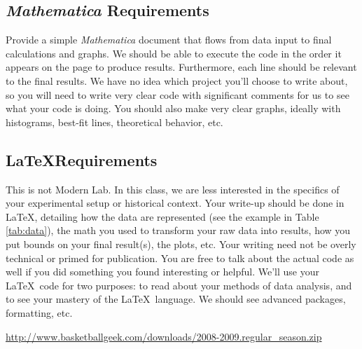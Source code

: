 \documentclass{article}
\begin{document}
\subsection{\textit{Mathematica} Requirements}
Provide a simple \textit{Mathematica} document that flows from data input to final calculations and graphs. We should
be able to execute the code in the order it appears on the page to produce results. Furthermore, each line should be
relevant to the final results. We have no idea which project you'll choose to write about, so you will need to write
very clear code with significant comments for us to see what your code is doing. You should also make very
clear graphs, ideally with histograms, best-fit lines, theoretical behavior, etc.

\subsection{\LaTeX Requirements}
This is not Modern Lab. In this class, we are less interested in the specifics of your experimental setup or historical context.
Your write-up should be done in \LaTeX, detailing how the data are represented (see the example in Table \ref{tab:data}),
the math you used to transform your raw data into results, how you put bounds on your final result(s), the plots, etc.
Your writing need not be overly technical or primed for publication. You are free to talk about the actual code as well
if you did something you found interesting or helpful. We'll use your \LaTeX~code for two purposes: to read
about your methods of data analysis, and to see your mastery of the \LaTeX~language. We should see advanced packages,
formatting, etc.

\begin{thebibliography}{9}
 \url{http://www.basketballgeek.com/downloads/2008-2009.regular_season.zip}
\end{thebibliography}
\end{document}
